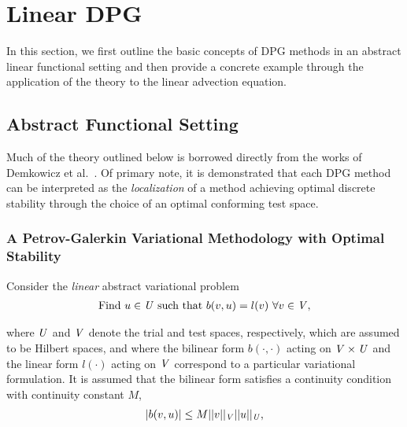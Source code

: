 
\section{Linear DPG} \label{sec:dpg_linear}

In this section, we first outline the basic concepts of DPG methods in an abstract linear functional setting and then
provide a concrete example through the application of the theory to the linear advection equation.

\subsection{Abstract Functional Setting}

Much of the theory outlined below is borrowed directly from the works of Demkowicz et
al.~\cite{Demkowicz2014_overview,Demkowicz2017}. Of primary note, it is demonstrated that each DPG method can be
interpreted as the \emph{localization} of a method achieving optimal discrete stability through the choice of an
optimal conforming test space.

\subsubsection{A Petrov-Galerkin Variational Methodology with Optimal Stability}
\label{sec:PG_aspect_of_DPG}

Consider the \emph{linear} abstract variational problem
\begin{align} \label{eq:bilinear_abstract_infinite}
\text{Find}\ u \in \mathit{{{U}}}\ \text{such that}\
b(v,u) = l(v)\ \forall v \in \mathit{{{V}}},
\end{align}

where $\mathit{{{U}}}$ and $\mathit{{{V}}}$ denote the trial and test spaces, respectively, which are assumed to be Hilbert
spaces, and where the bilinear form $b(\cdot,\cdot)$ acting on $\mathit{{{V}}} \times \mathit{{{U}}}$ and the linear form
$l(\cdot)$ acting on $\mathit{{{V}}}$ correspond to a particular variational formulation. It is assumed that the bilinear form
satisfies a continuity condition with continuity constant $M$,
\begin{align}
| b(v,u) | \le M
||v||_{\mathit{{{V}}}}
||u||_{\mathit{{{U}}}},
\end{align}

